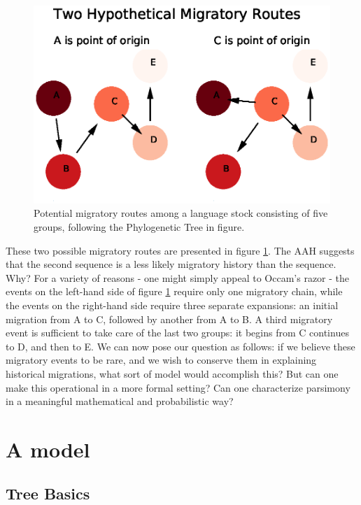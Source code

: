 \documentclass[11pt]{article}
\begin{document}
\begin{figure}
\begin{center} 
\includegraphics[width=\textwidth]{AncillaryFiles//figure2.eps} 
\caption{Potential migratory routes among a language stock consisting of five groups, following the Phylogenetic Tree in figure.} \label{fig2}
\end{center} 
\end{figure}

These two possible migratory routes are presented in figure \ref{fig2}. The AAH suggests that the second sequence is a less likely migratory history than the sequence. Why? For a variety of reasons - one might simply appeal to Occam's razor - the events on the left-hand side of figure \ref{fig2} require only one migratory chain, while the events on the right-hand side require three separate expansions: an initial migration from A to C, followed by another from A to B. A third migratory event is sufficient to take care of the last two groups: it begins from C continues to D, and then to E. We can now pose our question as follows: if we believe these migratory events to be rare, and we wish to conserve them in explaining historical migrations, what sort of model would accomplish this? But can one make this operational in a more formal setting? Can one characterize parsimony in a meaningful mathematical and probabilistic way? 

\section{A model}

\subsection{Tree Basics}
\end{document}
